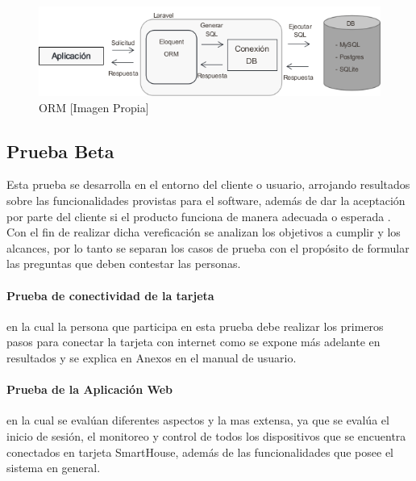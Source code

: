 \begin{figure}[!t]
	\centering
	\caption[ORM]{ORM [Imagen Propia]}
	\label{fig:orm}
	\includegraphics[width=0.9\linewidth]{Imagenes/ORM}
\end{figure}

\subsection{Prueba Beta}

Esta prueba se desarrolla en el entorno del cliente o usuario, arrojando resultados sobre las funcionalidades provistas para el software, además de dar la aceptación por parte del cliente si el producto funciona de manera adecuada o esperada \cite{PB}. Con el fin de realizar dicha vereficación se analizan los objetivos a cumplir y los alcances, por lo tanto se separan los casos de prueba con el propósito de formular las preguntas que deben contestar las personas.\\

\paragraph{Prueba de conectividad de la tarjeta} en la cual la persona que participa en esta prueba debe realizar los primeros pasos para conectar la tarjeta con internet como se expone más adelante en resultados y se explica en Anexos en el manual de usuario.\\

\paragraph{Prueba de la Aplicación Web} en la cual se evalúan diferentes aspectos y la mas extensa, ya que se evalúa el inicio de sesión, el monitoreo y control de todos los dispositivos que se encuentra conectados en tarjeta SmartHouse, además de las funcionalidades que posee el sistema en general.\\